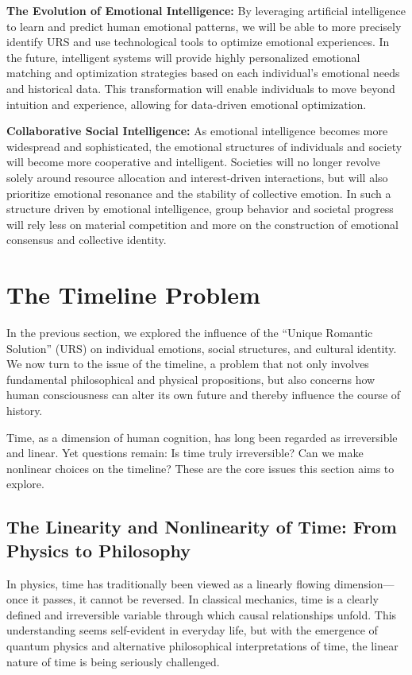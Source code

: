 \documentclass[12pt]{article}
\begin{document}
\textbf{The Evolution of Emotional Intelligence:} By leveraging artificial intelligence to learn and predict human emotional patterns, we will be able to more precisely identify URS and use technological tools to optimize emotional experiences. In the future, intelligent systems will provide highly personalized emotional matching and optimization strategies based on each individual's emotional needs and historical data. This transformation will enable individuals to move beyond intuition and experience, allowing for data-driven emotional optimization.

\textbf{Collaborative Social Intelligence:} As emotional intelligence becomes more widespread and sophisticated, the emotional structures of individuals and society will become more cooperative and intelligent. Societies will no longer revolve solely around resource allocation and interest-driven interactions, but will also prioritize emotional resonance and the stability of collective emotion. In such a structure driven by emotional intelligence, group behavior and societal progress will rely less on material competition and more on the construction of emotional consensus and collective identity.
\section{The Timeline Problem}

In the previous section, we explored the influence of the ``Unique Romantic Solution'' (URS) on individual emotions, social structures, and cultural identity. We now turn to the issue of the timeline, a problem that not only involves fundamental philosophical and physical propositions, but also concerns how human consciousness can alter its own future and thereby influence the course of history.

Time, as a dimension of human cognition, has long been regarded as irreversible and linear. Yet questions remain: Is time truly irreversible? Can we make nonlinear choices on the timeline? These are the core issues this section aims to explore.

\subsection{The Linearity and Nonlinearity of Time: From Physics to Philosophy}

In physics, time has traditionally been viewed as a linearly flowing dimension—once it passes, it cannot be reversed. In classical mechanics, time is a clearly defined and irreversible variable through which causal relationships unfold. This understanding seems self-evident in everyday life, but with the emergence of quantum physics and alternative philosophical interpretations of time, the linear nature of time is being seriously challenged.
\end{document}
